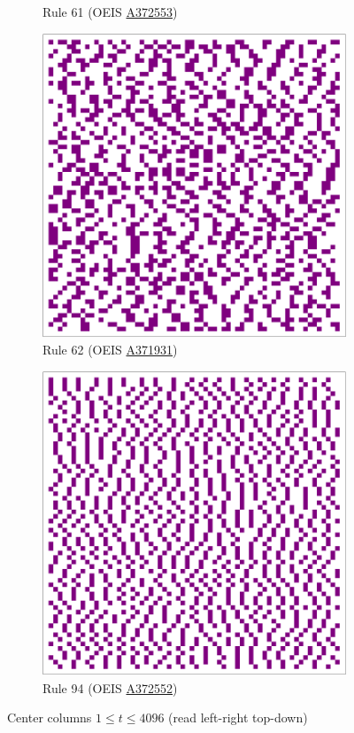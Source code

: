 \documentclass{article}
\begin{document}
\begin{figure}[H]
\begin{subfigure}[b]{0.49\textwidth}
        \caption{Rule 61 (OEIS \href{https://oeis.org/A372553}{A372553})}
        \label{fig:rule-61-center_column_plot-4096}
    \end{subfigure}
    \begin{subfigure}[b]{0.49\textwidth}
        \centering
        \includegraphics[width=.8\textwidth]{graphics/behavior/center-columns/rule-62-center_column_plot-4096.pdf}
        \caption{Rule 62 (OEIS \href{https://oeis.org/A371931}{A371931})}
        \label{fig:rule-62-center_column_plot-4096}
    \end{subfigure}
    \vspace{4pt}
    \begin{subfigure}[b]{0.49\textwidth}
        \centering
        \includegraphics[width=.8\textwidth]{graphics/behavior/center-columns/rule-94-center_column_plot-4096.pdf}
        \caption{Rule 94 (OEIS \href{https://oeis.org/A372552}{A372552})}
        \label{fig:rule-94-center_column_plot-4096}
    \end{subfigure}
       \caption{Center columns $1\leq t \leq 4096$ (read left-right top-down)}
       \label{fig:center-columns}
\end{figure}
\end{document}

